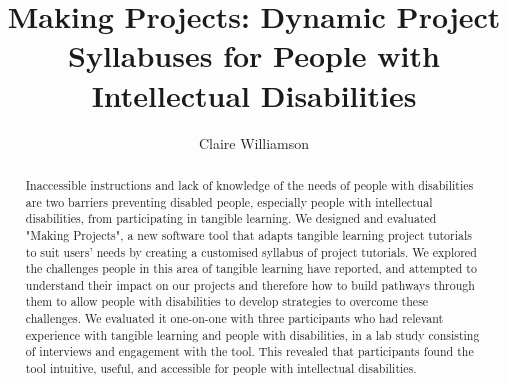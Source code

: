 \documentclass{l4proj}
\begin{document}
\title{Making Projects: Dynamic Project Syllabuses for People with Intellectual Disabilities}
\author{Claire Williamson}

\maketitle

\begin{abstract} 
    Inaccessible instructions and lack of knowledge of the needs of people with disabilities are two barriers preventing disabled people, especially people with intellectual disabilities, from participating in tangible learning. We designed and evaluated "Making Projects", a new software tool that adapts tangible learning project tutorials to suit users' needs by creating a customised syllabus of project tutorials. We explored the challenges people in this area of tangible learning have reported, and attempted to understand their impact on our projects and therefore how to build pathways through them to allow people with disabilities to develop strategies to overcome these challenges. We evaluated it one-on-one with three participants who had relevant experience with tangible learning and people with disabilities, in a lab study consisting of interviews and engagement with the tool.  This revealed that participants found the tool intuitive, useful, and accessible for people with intellectual disabilities.   

\end{abstract}


%
%
\def\consentname {Claire Williamson} %
\def\consentdate {24 March 2023} %
%
\educationalconsent
\end{document}
